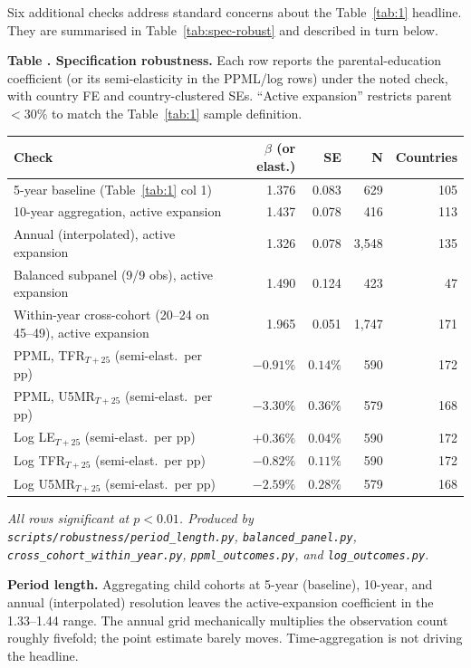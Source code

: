 \documentclass[12pt,letterpaper]{article}
\begin{document}
{Six additional checks address standard concerns about the Table~\ref{tab:1}
headline. They are summarised in Table~\ref{tab:spec-robust} and described
in turn below.

\label{tab:spec-robust}\textbf{Table \thetable. Specification robustness.}
Each row reports the parental-education coefficient (or its semi-elasticity
in the PPML/log rows) under the noted check, with country FE and
country-clustered SEs. ``Active expansion'' restricts parent
$<30$\% to match the Table~\ref{tab:1} sample definition.

{\small
\begin{longtable}[]{@{}lrrrr@{}}
\toprule
Check & $\beta$ (or elast.) & SE & N & Countries \\
\midrule
\endhead
5-year baseline (Table~\ref{tab:1} col 1) & 1.376 & 0.083 & 629 & 105 \\
10-year aggregation, active expansion     & 1.437 & 0.078 & 416 & 113 \\
Annual (interpolated), active expansion   & 1.326 & 0.078 & 3{,}548 & 135 \\
Balanced subpanel (9/9 obs), active expansion & 1.490 & 0.124 & 423 & 47 \\
Within-year cross-cohort (20--24 on 45--49), active expansion & 1.965 & 0.051 & 1{,}747 & 171 \\
PPML, TFR$_{T+25}$ (semi-elast.\ per pp)   & $-0.91\%$ & $0.14\%$ & 590 & 172 \\
PPML, U5MR$_{T+25}$ (semi-elast.\ per pp)  & $-3.30\%$ & $0.36\%$ & 579 & 168 \\
Log LE$_{T+25}$ (semi-elast.\ per pp)      & $+0.36\%$ & $0.04\%$ & 590 & 172 \\
Log TFR$_{T+25}$ (semi-elast.\ per pp)     & $-0.82\%$ & $0.11\%$ & 590 & 172 \\
Log U5MR$_{T+25}$ (semi-elast.\ per pp)    & $-2.59\%$ & $0.28\%$ & 579 & 168 \\
\bottomrule
\end{longtable}
}

\emph{All rows significant at $p<0.01$. Produced by
\texttt{scripts/robustness/period\_length.py},
\texttt{balanced\_panel.py},
\texttt{cross\_cohort\_within\_year.py},
\texttt{ppml\_outcomes.py}, and
\texttt{log\_outcomes.py}.}

\textbf{Period length.} Aggregating child cohorts at 5-year (baseline),
10-year, and annual (interpolated) resolution leaves the active-expansion
coefficient in the 1.33--1.44 range. The annual grid mechanically
multiplies the observation count roughly fivefold; the point estimate
barely moves. Time-aggregation is not driving the headline.

}
\end{document}
